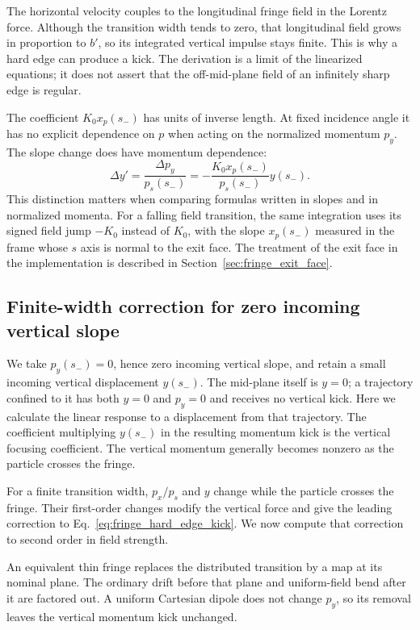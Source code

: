 The horizontal velocity couples to the longitudinal fringe field in the
Lorentz force. Although the transition width tends to zero, that
longitudinal field grows in proportion to $b'$, so its integrated vertical
impulse stays finite. This is why a hard edge can produce a kick.
The derivation is a limit of the linearized equations; it does not assert
that the off-mid-plane field of an infinitely sharp edge is regular.

The coefficient $K_0x_p(s_-)$ has units of inverse length. At fixed incidence
angle it has no explicit dependence on $p$ when acting on the normalized
momentum $p_y$. The slope change does have momentum dependence:
\begin{equation}
 \Delta y'=\frac{\Delta p_y}{p_s(s_-)}
           =-\frac{K_0x_p(s_-)}{p_s(s_-)}y(s_-).
\end{equation}
This distinction matters when comparing formulas written in slopes and in
normalized momenta. For a falling field transition, the same integration
uses its signed field jump $-K_0$ instead of $K_0$, with the slope
$x_p(s_-)$ measured in the frame whose $s$ axis is normal to the exit face.
The treatment of the exit face in the implementation is described in
Section~\ref{sec:fringe_exit_face}.

\subsection{Finite-width correction for zero incoming vertical slope}

We take $p_y(s_-)=0$, hence zero incoming vertical slope, and retain a
small incoming vertical displacement $y(s_-)$. The mid-plane itself is
$y=0$; a trajectory confined to it has both $y=0$ and $p_y=0$ and receives
no vertical kick. Here we calculate the linear response to a displacement
from that trajectory. The coefficient multiplying $y(s_-)$ in the
resulting momentum kick is the vertical focusing coefficient. The vertical
momentum generally becomes nonzero as the particle crosses the fringe.

For a finite transition width, $p_x/p_s$ and $y$ change while the particle
crosses the fringe. Their first-order changes modify the vertical force
and give the leading correction to Eq.~\eqref{eq:fringe_hard_edge_kick}.
We now compute that correction to second order in field strength.

An equivalent thin fringe replaces the distributed transition by a map at
its nominal plane. The ordinary drift before that plane and uniform-field
bend after it are factored out. A uniform Cartesian dipole does not change
$p_y$, so its removal leaves the vertical momentum kick unchanged.

